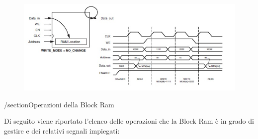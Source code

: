 \begin{itemize}
\begin{figure}[!h]
\centering
\includegraphics[width=\textwidth]{img/blockRam/noChange.jpg}
\label{fig:set_ass}
\end{figure}

\end{itemize}

/section{Operazioni della Block Ram}

Di seguito viene riportato l'elenco delle operazioni che la Block Ram  \`e in grado di gestire e dei relativi segnali impiegati:

